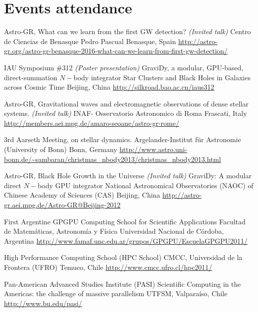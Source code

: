 \documentclass[12pt,a4paper]{moderncv}
\newcommand{\gray}{\textcolor{gray}}
\newcommand{\myurl}[1]{\gray{\url{#1}}}
\begin{document}
\section{\LARGE Events attendance}
        {Astro-GR, What can we learn from the first GW detection? \emph{(Invited talk)}}
        {Centro de Ciencias de Benasque Pedro Pascual}
        {Benasque, Spain}
        {\myurl{http://astro-gr.org/astro-gr-benasque-2016-what-can-we-learn-from-first-gw-detection/}}
        {}

        {IAU Symposium \#312 \emph{(Poster presentation)}}
        {GraviDy, a modular, GPU-based, direct-summation $N-$body integrator}
        {Star Clusters and Black Holes in Galaxies across Cosmic Time}
        {Beijing, China}
        {\myurl{http://silkroad.bao.ac.cn/iaus312}}

        {Astro-GR, Gravitational waves and electromagnetic observations of dense
        stellar systems. \emph{(Invited talk)}}
        {INAF- Osservatorio Astronomico di Roma}
        {Frascati, Italy}
        {\myurl{http://members.aei.mpg.de/amaro-seoane/astro-gr-rome/}}
        {}

        {3rd Aarseth Meeting, on stellar dynamics.}
        {Argelander-Institut für Astronomie (University of Bonn)}
        {Bonn, Germany}
        {\myurl{http://www.astro.uni-bonn.de/~sambaran/christmas_nbody2013/christmas_nbody2013.html}}
        {}

        {Astro-GR, Black Hole Growth in the Universe \emph{(Invited talk)}}
        {GraviDy: A modular direct $N-$body GPU integrator}
        {National Astronomical Observatories (NAOC) of Chinese Academy of Sciences
        (CAS)}
        {Beijing, China}
        {\myurl{http://astro-gr.aei.mpg.de/Astro-GR@Beijing-2012}}

        {First Argentine GPGPU Computing School for Scientific Applications}
        {Facultad de Matemáticas, Astronomía y Física}
        {Universidad Nacional de Córdoba, Argentina}
        {\myurl{http://www.famaf.unc.edu.ar/grupos/GPGPU/EscuelaGPGPU2011/}}
        {}

        {High Performance Computing School}
        {(HPC School)}
        {CMCC, Universidad de la Frontera (UFRO)}
        {Temuco, Chile}
        {\myurl{http://www.cmcc.ufro.cl/hpc2011/}}

        {Pan-American Advanced Studies Institute}
        {(PASI)}
        {Scientific Computing in the Americas: the challenge of massive parallelism}
        {UTFSM, Valparaíso, Chile}
        {\myurl{http://www.bu.edu/pasi/}}
\end{document}
